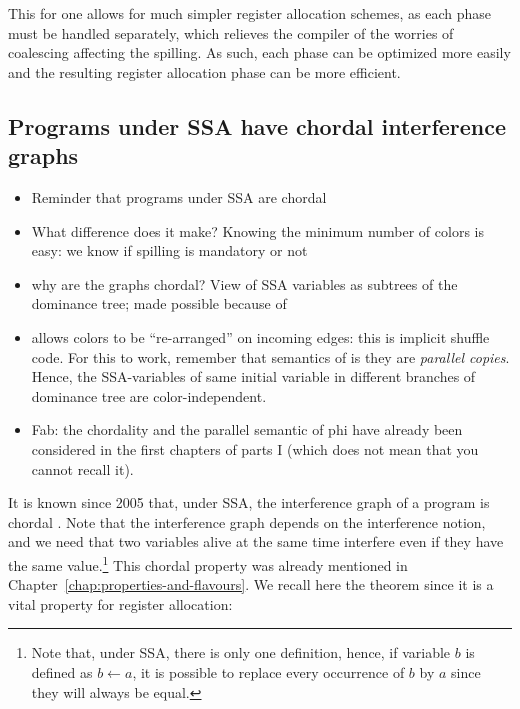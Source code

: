 {This for one allows for much simpler register allocation schemes, as each phase 
must be handled separately, which relieves the compiler of the worries of 
coalescing affecting the spilling. As such, each phase can be optimized more 
easily and the resulting register allocation phase can be more efficient.





\subsection{Programs under SSA have chordal interference graphs}
{\sl 
\begin{itemize}
  \item Reminder that programs under SSA are chordal
  \item What difference does it make? Knowing the minimum number of colors is 
    easy: we know if spilling is mandatory or not
  \item why are the graphs chordal? View of SSA variables as subtrees of the 
    dominance tree; made possible because of \phifuns
  \item \phifuns allows colors to be ``re-arranged'' on incoming edges: this 
    is implicit shuffle code. For this to work, remember that semantics of 
    \phifun is they are \emph{parallel copies}. Hence, the SSA-variables of 
    same initial variable in different branches of dominance tree are 
    color-independent.

  \item Fab: the chordality and the parallel semantic of phi have already been considered in the first chapters of parts I (which does not mean that you cannot recall it).

\end{itemize}
}

It is known since 2005 that, under SSA, the interference graph of a program is 
chordal \cite{Brisk05,Pereira05:chordal,Hack06}.  Note that the interference 
graph depends on the interference notion, and we need that two variables alive 
at the same time interfere even if they have the same value.\footnote{Note that, under 
SSA, there is only one definition, hence, if variable $b$ is defined as $b\gets 
a$, it is possible to replace every occurrence of $b$ by $a$ since they will 
always be equal.
}
This chordal property was already mentioned in 
Chapter~\ref{chap:properties-and-flavours}. We recall here the theorem since it 
is a vital property for register allocation:

}
